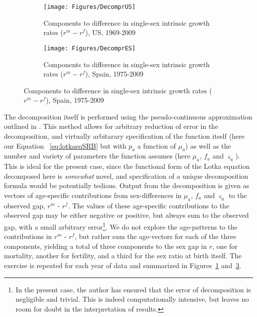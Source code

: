 \begin{figure}[h!]
        \centering
        \begin{subfigure}
                \centering
                \caption{Components to difference in single-sex intrinsic growth
                rates ($r^m - r^f$), US, 1969-2009}
                \texttt{[image: Figures/DecomprUS]}
                \label{fig:DecomprUS}
        \end{subfigure}
        \begin{subfigure}
                \centering
                \caption{Components to difference in single-sex intrinsic growth
                rates ($r^m - r^f$), Spain, 1975-2009}
                \texttt{[image: Figures/DecomprES]}  
                \label{fig:DecomprES}
        \end{subfigure}
\end{figure}

The decomposition itself is performed using the
pseudo-continuous approximation outlined in \citet{horiuchi2008decomposition}. 
This method allows for arbitrary reduction of error in the decomposition, and
virtually arbitarary specification of the function itself (here our Equation
~\eqref{eq:lotkaeqSRB} but with $p_a$ a function of $\mu_a$) as well as the
number and variety of parameters the function assumes (here $\mu _a$, $f_a$ and $\varsigma _a$). This is ideal for
the present case, since the functional form of the Lotka equation decomposed
here is \textit{somewhat} novel, and specification of a unique decomposition
formula would be potentially tedious. Output from the decomposition is given as
vectors of age-specific contributions from sex-differences in $\mu
_a$, $f_a$ and $\varsigma _a$ to the observed gap, $r^m$ - $r^f$. The values of these age-specific contributions to the observed gap may be either negative or
positive, but always sum to the observed gap, with a small arbitrary
error\footnote{In the present case, the author has ensured that the error of
decomposition is negligible and trivial. This is indeed computationally
intensive, but leaves no room for doubt in the interpretation of results.}. We
do not explore the age-patterns to the contributions in $r^m$ - $r^f$, but
rather sum the age-vectors for each of the three components, yielding a total of
three components to the sex gap in $r$, one for mortality, another for
fertility, and a third for the sex ratio at birth itself. The exercise is
repeated for each year of data and summarized in Figures~\ref{fig:DecomprUS}
and~\ref{fig:DecomprES}.


